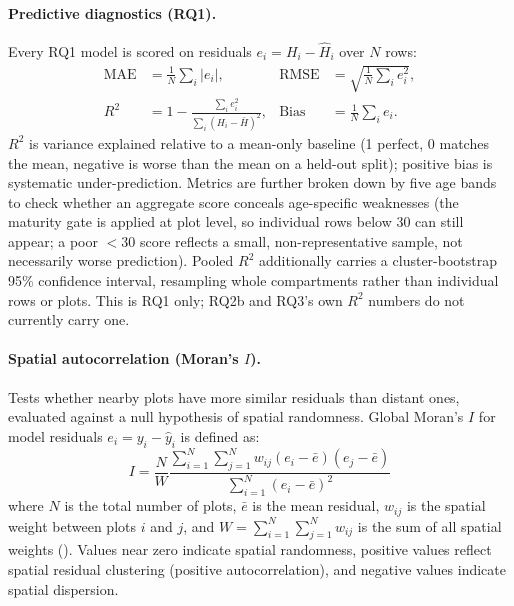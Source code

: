 \documentclass[11pt,a4paper]{report}
\begin{document}
\paragraph*{Predictive diagnostics (RQ1).}
Every RQ1 model is scored on residuals $e_i = H_i - \hat H_i$ over $N$ rows:
\begin{align*}
\text{MAE} &= \frac{1}{N}\sum_i |e_i|, &
\text{RMSE} &= \sqrt{\frac{1}{N}\sum_i e_i^2}, \\
R^2 &= 1 - \frac{\sum_i e_i^2}{\sum_i (H_i - \bar H)^2}, &
\text{Bias} &= \frac{1}{N}\sum_i e_i.
\end{align*}
$R^2$ is variance explained relative to a mean-only baseline (1 perfect, 0 matches the mean,
negative is worse than the mean on a held-out split); positive bias is systematic
under-prediction. Metrics are further broken down by five age bands to check whether an
aggregate score conceals age-specific weaknesses (the maturity gate is applied at plot level, so
individual rows below 30 can still appear; a poor $<30$ score reflects a small, non-representative
sample, not necessarily worse prediction). Pooled $R^2$ additionally carries a cluster-bootstrap
95\% confidence interval, resampling whole compartments rather than individual rows or plots. This
is RQ1 only; RQ2b and RQ3's own $R^2$ numbers do not currently carry one.


\paragraph*{Spatial autocorrelation (Moran's $I$).}
Tests whether nearby plots have more similar residuals than distant ones, evaluated against a null hypothesis of spatial randomness. Global Moran's $I$ for model residuals $e_i = y_i - \hat{y}_i$ is defined as:
\begin{equation}
    I = \frac{N}{W} \frac{\sum_{i=1}^{N} \sum_{j=1}^{N} w_{ij} (e_i - \bar{e})(e_j - \bar{e})}{\sum_{i=1}^{N} (e_i - \bar{e})^2}
    \label{eq:morans_i}
\end{equation}
where $N$ is the total number of plots, $\bar{e}$ is the mean residual, $w_{ij}$ is the spatial weight between plots $i$ and $j$, and $W = \sum_{i=1}^N \sum_{j=1}^N w_{ij}$ is the sum of all spatial weights (). Values near zero indicate spatial randomness, positive values reflect spatial residual clustering (positive autocorrelation), and negative values indicate spatial dispersion.
\end{document}
